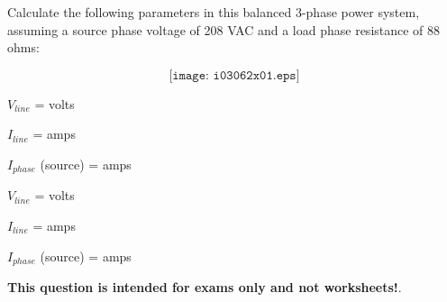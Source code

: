 

Calculate the following parameters in this balanced 3-phase power system, assuming a source phase voltage of 208 VAC and a load phase resistance of 88 ohms:

$$\texttt{[image: i03062x01.eps]}$$

$V_{line}$ = \underbar{\hskip 50pt} volts

\vskip 10pt

$I_{line}$ = \underbar{\hskip 50pt} amps

\vskip 10pt

$I_{phase}$ (source) = \underbar{\hskip 50pt} amps







$V_{line}$ =  volts

$I_{line}$ =  amps

$I_{phase}$ (source) =  amps







{\bf This question is intended for exams only and not worksheets!}.


